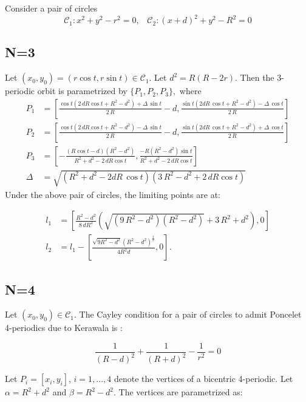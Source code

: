 Consider a pair of circles
\[\mathcal{C}_1: x^2+y^2-r^2=0, \;\;\; \mathcal{C}_2: (x+d)^2+y^2-R^2=0\]

\subsection{N=3}

Let $(x_0,y_0)=(r\cos t,r\sin t) \in \mathcal{C}_1$. Let
$d^2=R(R-2r)$. Then the 3-periodic orbit is parametrized by
$\{P_1,P_2,P_3 \}, $ where
{\small  
\begin{align*}
P_1&=\left[{\frac {\cos t(2\,d R    \cos  t    +    {R}^{2}-  {d}^{2})+\Delta\,\sin t}{2\,R}}-d, {\frac {\sin t( 2d R\, \cos
 t  +  {R}^{2}-d^2) -\Delta\,\cos t }{2\,R}}\right]
\\
P_2&=\left[ {\frac { \cos t(2\,d R  \cos t     +{R}^{2}- {d}^{2})-\Delta\,\sin
 t }{2\,R}}-d,{\frac {\sin t(2d R\,  \cos
 t  +   {R}^{2}-  {d}^{2})+\Delta\,\cos t }{2\,R}}\right]
\\
 P_3&=\left[-{\frac { \left( R\cos t   -d \right)  \left( {R}^{2}-{d
}^{2} \right) }{     R^2+d^2-2\,d R\cos t }   }, {\frac 
{ -R\left(   R^2-d^2 \right) \sin t }{ R^2+d^2-2\,d R \cos
 t  }}\right]\\
 \Delta&=\sqrt { \left(  R^2+d^2-2d R\,\cos t   \right) 
 \left(   3\, R^2-d^2 +2\,d R\cos t\right) }
 \end{align*}
 }
Under the above pair of circles, the limiting points are at:

\begin{align*}
    l_1&=\left[\frac{  R^2-d^2 }{8\,d {R}^{2} }
 \left( \sqrt {   (9\,R^2-d^2)    
  (R^2-d^2)     }+3\, R^2+d^2 \right) 
,0\right]\\
l_2&=l_1-\left[\frac{\sqrt{9R^2 - d^2} (R^2-d^2)^{\frac{3}{2}}}{4R^2d}, 0\right].
\end{align*}
 
\subsection{N=4}

Let $(x_0,y_0)\in \mathcal{C}_1$. 
The Cayley condition for a pair of circles to admit Poncelet 4-periodics due to Kerawala is \cite[Poncelet's Porism, Eq. 39]{mw}:

\[ \frac{1}{(R-d)^2}+ \frac{1}{(R+d)^2}-\frac{1}{r^2}=0 \]
  
Let $P_i=[x_i,y_i]$, $i=1,...,4$ denote the vertices of a bicentric 4-periodic. Let $\alpha=R^2+d^2$ and $\beta=R^2-d^2$. The vertices are parametrized as:
 
